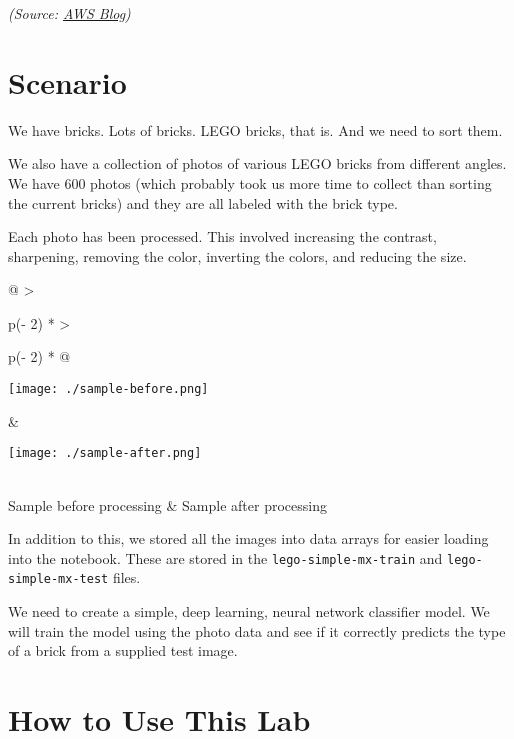 \documentclass[11pt]{article}
\begin{document}
\emph{(Source:
\href{https://aws.amazon.com/blogs/machine-learning/introducing-gluon-an-easy-to-use-programming-interface-for-flexible-deep-learning/}{AWS
Blog})}

\section{Scenario}\label{scenario}

We have bricks. Lots of bricks. LEGO bricks, that is. And we need to
sort them.

We also have a collection of photos of various LEGO bricks from
different angles. We have 600 photos (which probably took us more time
to collect than sorting the current bricks) and they are all labeled
with the brick type.

Each photo has been processed. This involved increasing the contrast,
sharpening, removing the color, inverting the colors, and reducing the
size.

\begin{longtable}[]{@{}
  >{\raggedright\arraybackslash}p{(\columnwidth - 2\tabcolsep) * }
  >{\raggedright\arraybackslash}p{(\columnwidth - 2\tabcolsep) * }@{}}
\toprule\noalign{}
\begin{minipage}[b]{\linewidth}\raggedright
\texttt{[image: ./sample-before.png]}
\end{minipage} & \begin{minipage}[b]{\linewidth}\raggedright
\texttt{[image: ./sample-after.png]}
\end{minipage} \\
\midrule\noalign{}
\endhead
\bottomrule\noalign{}
\endlastfoot
Sample before processing & Sample after processing \\
\end{longtable}

In addition to this, we stored all the images into data arrays for
easier loading into the notebook. These are stored in the
\texttt{lego-simple-mx-train} and \texttt{lego-simple-mx-test} files.

We need to create a simple, deep learning, neural network classifier
model. We will train the model using the photo data and see if it
correctly predicts the type of a brick from a supplied test image.

    \section{How to Use This Lab}\label{how-to-use-this-lab}
\end{document}
